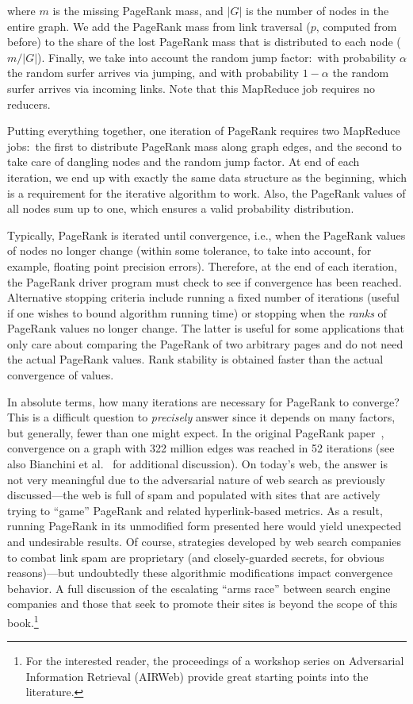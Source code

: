 \noindent where $m$ is the missing PageRank mass, and $|G|$ is the
number of nodes in the entire graph.  We add the PageRank mass from
link traversal ($p$, computed from before) to the share of the lost
PageRank mass that is distributed to each node ($m/|G|$).  Finally, we
take into account the random jump factor:\ with probability $\alpha$
the random surfer arrives via jumping, and with probability $1-\alpha$
the random surfer arrives via incoming links.  Note that this
MapReduce job requires no reducers.

Putting everything together, one iteration of PageRank requires two
MapReduce jobs:\ the first to distribute PageRank mass along graph
edges, and the second to take care of dangling nodes and the random
jump factor.  At end of each iteration, we end up with
exactly the same data structure as the beginning, which is a
requirement for the iterative algorithm to work.  Also, the PageRank
values of all nodes sum up to one, which ensures a valid probability
distribution.

Typically, PageRank is iterated until convergence, i.e., when the
PageRank values of nodes no longer change (within some tolerance, to
take into account, for example, floating point precision errors).
Therefore, at the end of each iteration, the PageRank driver program
must check to see if convergence has been reached.  Alternative
stopping criteria include running a fixed number of iterations (useful
if one wishes to bound algorithm running time) or stopping when the
{\it ranks} of PageRank values no longer change.  The latter is useful
for some applications that only care about comparing the PageRank of
two arbitrary pages and do not need the actual PageRank values.  Rank
stability is obtained faster than the actual convergence of values.

In absolute terms, how many iterations are necessary for PageRank to
converge?  This is a difficult question to {\it precisely} answer
since it depends on many factors, but generally, fewer than one might
expect.  In the original PageRank paper~\cite{Page_etal_1999},
convergence on a graph with 322 million edges was reached in 52
iterations (see also Bianchini et al.~\cite{Bianchini_etal_2005} for
additional discussion).  On today's web, the answer is not very
meaningful due to the adversarial nature of web search as previously
discussed---the web is full of spam and populated with sites that are
actively trying to ``game'' PageRank and related hyperlink-based
metrics.  As a result, running PageRank in its unmodified form
presented here would yield unexpected and undesirable results.  Of
course, strategies developed by web search companies to combat link
spam are proprietary (and closely-guarded secrets, for obvious
reasons)---but undoubtedly these algorithmic modifications impact
convergence behavior.  A full discussion of the escalating ``arms
race'' between search engine companies and those that seek to promote
their sites is beyond the scope of this book.\footnote{For the
  interested reader, the proceedings of a workshop series on
  Adversarial Information Retrieval (AIRWeb) provide great starting
  points into the literature.}

